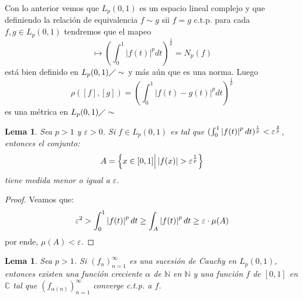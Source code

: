 \documentclass[twoside,12pt,a4 paper,openright]{book}
\newtheorem{lem}[claim]{Lema}
\begin{document}
\begin{enumerate}
    Con lo anterior vemos que $ L_p(0,1)$ es un espacio lineal complejo y que definiendo la relaci\'on de equivalencia $f \sim g$ sii $f=g$ c.t.p. para cada $f,g \in   L_p(0,1)$ tendremos que el mapeo 
    \begin{equation*}
        [f]\mapsto \left(  \int_0^1 |f(t)|^p dt\right) ^{\frac{1}{p}}=N_p(f)
    \end{equation*}
    est\'a bien definido en $  L_p(0,1) \diagup \sim $ y m\'as a\'un que es una norma. Luego
    \begin{equation*}
        \rho([f],[g])=  \left(  \int_0^1 |f(t)- g(t)|^p dt\right) ^{\frac{1}{p}}
    \end{equation*}
    es una m\'etrica en  $ L_p(0,1) \diagup  \sim$

    \begin{lem}
        Sea $p>1$ y $\varepsilon>0$. Si $f\in L_p(0,1)$ es tal que $(\int_{0}^{1}\left|f(t)\right|^pdt)^{\frac{1}{p}}<\varepsilon^{\frac{2}{p}}$, entonces el conjunto:
        \begin{equation*}
            A=\left\{x\in[0,1]\Big|\abs{f(x)}>\varepsilon^{\frac{1}{p}} \right\}
        \end{equation*}
        tiene medida menor o igual a $\varepsilon$.
    \end{lem}

    \begin{proof}
        Veamos que:
        \begin{equation*}
            \varepsilon^2>\int_{0}^{1}\left|f(t)\right|^pdt\geq\int_{A}\left|f(t)\right|^pdt\geq\varepsilon\cdot \mu(A)
        \end{equation*}
        por ende, $\mu(A)<\varepsilon$.
    \end{proof}

    \begin{lem}
        Sea $p>1$. Si $\left(f_n \right)_{ n=1}^\infty$ es una sucesi\'on de Cauchy en $L_p(0,1)$, entonces existen una funci\'on creciente $\alpha$ de $\mathbb{N}$ en $\mathbb{N}$ y una funci\'on $f$ de $[0,1]$ en $\mathbb{C}$ tal que $\left(f_{\alpha(n)} \right)_{ n=1}^\infty$ converge c.t.p. a $f$.
    \end{lem}


\end{enumerate}
\end{document}
